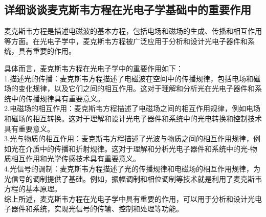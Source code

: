 \documentclass[12pt, a4paper, oneside]{article}
\begin{document}
\begin{spacing}{2.0}
\section{详细谈谈麦克斯韦方程在光电子学基础中的重要作用}
麦克斯韦方程是描述电磁波的基本方程，包括电场和磁场的生成、传播和相互作用等方面。在光电子学中，麦克斯韦方程被广泛应用于分析和设计光电子器件和系统，具有重要的作用。

具体而言，麦克斯韦方程在光电子学中的重要作用如下：
\\
1.描述光的传播：麦克斯韦方程描述了电磁波在空间中的传播规律，包括电场和磁场的变化规律，以及它们之间的相互作用。这对于理解和分析光在光电子器件和系统中的传播规律具有重要意义。
\\
2.电磁场的相互作用：麦克斯韦方程描述了电磁场之间的相互作用规律，例如电场和磁场的相互转换。这对于理解和设计光电子器件和系统中的光电转换和控制技术具有重要意义。
\\
3.光与物质的相互作用：麦克斯韦方程描述了光波与物质之间的相互作用规律，例如光在介质中的传播和折射规律。这对于理解和分析光电子器件和系统中的光-物质相互作用和光学传感技术具有重要意义。
\\
4.光信号的调制：麦克斯韦方程描述了光的传播规律和电磁场的相互作用规律，为光信号的调制提供了基础。例如，振幅调制和相位调制等技术就是利用了麦克斯韦方程的基本原理。
\\
综上所述，麦克斯韦方程在光电子学中具有重要的作用，可以用于分析和设计光电子器件和系统，实现光信号的传输、控制和处理等功能。





\end{spacing}
\end{document}
